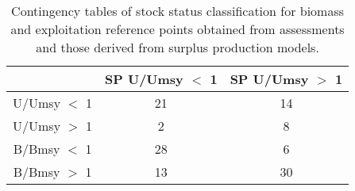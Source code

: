 \begin{table}[ht]
\begin{center}
\begin{tabular}{ccc}
  \hline
 & SP U/Umsy $<$ 1 & SP U/Umsy $>$ 1 \\ 
  \hline
U/Umsy $<$ 1 &  21 &  14 \\ 
  U/Umsy $>$ 1 &   2 &   8 \\ 
  B/Bmsy $<$ 1 &  28 &   6 \\ 
  B/Bmsy $>$ 1 &  13 &  30 \\ 
   \hline
\end{tabular}
\caption{Contingency tables of stock status classification for biomass and exploitation reference points obtained from assessments and those derived from surplus production models. }
\label{tab:contingency}
\end{center}
\end{table}
